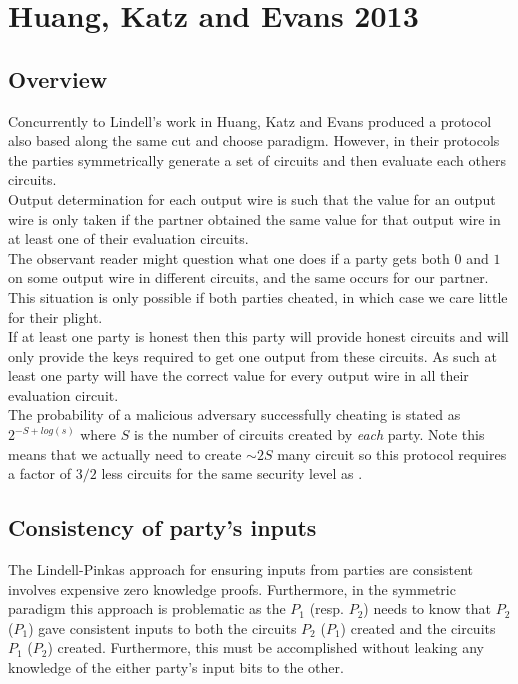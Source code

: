 \documentclass[ %
                    author={Nicholas Tutte},
                supervisor={Prof. Nigel Smart},
                    degree={MEng},
                     title={Secure Two Party Computation},
                  subtitle={A practical comparison of recent protocols},
                      type={Research - GG1K},
                      year={2015} ]{dissertation}
\begin{document}
		\section{Huang, Katz and Evans 2013}
			\subsection*{Overview}

				Concurrently to Lindell's work in \cite{Lindell_CnC_2013} Huang, Katz and Evans produced a protocol also based along the same cut and choose paradigm. However, in their protocols the parties symmetrically generate a set of circuits and then evaluate each others circuits.\\

				Output determination for each output wire is such that the value for an output wire is only taken if the partner obtained the same value for that output wire in at least one of their evaluation circuits.\\

				The observant reader might question what one does if a party gets both $0$ and $1$ on some output wire in different circuits, and the same occurs for our partner. This situation is only possible if both parties cheated, in which case we care little for their plight.\\

				If at least one party is honest then this party will provide honest circuits and will only provide the keys required to get one output from these circuits. As such at least one party will have the correct value for every output wire in all their evaluation circuit.\\

				The probability of a malicious adversary successfully cheating is stated as $2^{-S + log(s)}$ where $S$ is the number of circuits created by \emph{each} party. Note this means that we actually need to create $\sim 2S$ many circuit so this protocol requires a factor of $3/2$ less circuits for the same security level as \cite{LindellAndPinkas2011}.\\
				
			\subsection{Consistency of party's inputs} \label{sub:HKE_Consistency}
				The Lindell-Pinkas approach for ensuring inputs from parties are consistent involves expensive zero knowledge proofs. Furthermore, in the symmetric paradigm this approach is problematic as the $P_1$ (resp. $P_2$) needs to know that $P_2$ ($P_1$) gave consistent inputs to both the circuits $P_2$ ($P_1$) created and the circuits $P_1$ ($P_2$) created. Furthermore, this must be accomplished without leaking any knowledge of the either party's input bits to the other.\\
\end{document}
